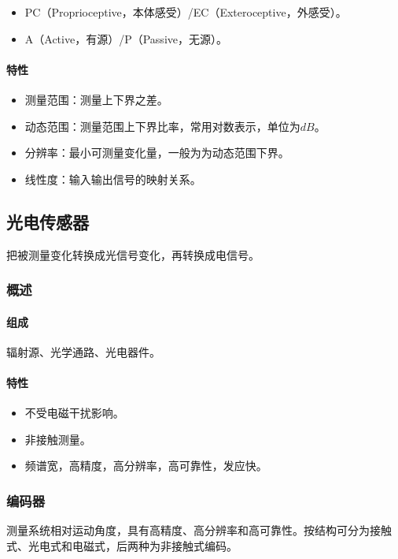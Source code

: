 \documentclass[
12pt, %
a4paper, 
oneside, %
headinclude,footinclude, %
]{scrartcl}
\begin{document}
\begin{itemize}
\item PC（Proprioceptive，本体感受）/EC（Exteroceptive，外感受）。
\item A（Active，有源）/P（Passive，无源）。
\end{itemize}
\paragraph{特性}
\begin{itemize}
\item 测量范围：测量上下界之差。    
\item 动态范围：测量范围上下界比率，常用对数表示，单位为$ dB $。
\item 分辨率：最小可测量变化量，一般为为动态范围下界。
\item 线性度：输入输出信号的映射关系。
\end{itemize}
\subsection[光电传感器]{光电传感器}
把被测量变化转换成光信号变化，再转换成电信号。
\subsubsection[概述]{概述}
\paragraph{组成}
辐射源、光学通路、光电器件。
\paragraph{特性}
\begin{itemize}
\item 不受电磁干扰影响。
\item 非接触测量。
\item 频谱宽，高精度，高分辨率，高可靠性，发应快。
\end{itemize}
\subsubsection[编码器]{编码器}
测量系统相对运动角度，具有高精度、高分辨率和高可靠性。按结构可分为接触式、光电式和电磁式，后两种为非接触式编码。
\end{document}
